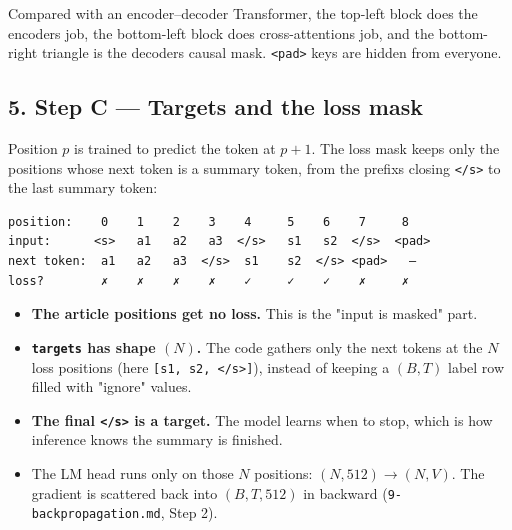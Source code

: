 \documentclass[11pt,a4paper,oneside]{report}
\providecommand{\tightlist}{\setlength{\itemsep}{0pt}\setlength{\parskip}{0pt}}
\begin{document}
Compared with an encoder--decoder Transformer, the top-left block does the encoder\textquotesingle s job, the bottom-left block does cross-attention\textquotesingle s job, and the bottom-right triangle is the decoder\textquotesingle s causal mask. \texttt{\textless{}pad\textgreater{}} keys are hidden from everyone.

\subsection{5. Step C --- Targets and the loss mask}\label{5-step-c--targets-and-the-loss-mask}

Position \(p\) is trained to predict the token at \(p + 1\). The loss mask keeps only the positions whose next token is a summary token, from the prefix\textquotesingle s closing \texttt{\textless{}/\allowbreak{}s\textgreater{}} to the last summary token:

\begin{center}\end{center}

\begin{Verbatim}[fontsize=\small]
position:    0    1    2    3    4     5    6    7     8
input:      <s>   a1   a2   a3  </s>   s1   s2  </s>  <pad>
next token:  a1   a2   a3  </s>  s1    s2  </s> <pad>   –
loss?        ✗    ✗    ✗    ✗    ✓     ✓    ✓    ✗     ✗
\end{Verbatim}

\begin{itemize}
\tightlist
\item
  \textbf{The article positions get no loss.} This is the "input is masked" part.
\item
  \textbf{\texttt{targets} has shape \((N)\).} The code gathers only the next tokens at the \(N\) loss positions (here \texttt{{[}s1,\ s2,\ \textless{}/s\textgreater{}{]}}), instead of keeping a \((B, T)\) label row filled with "ignore" values.
\item
  \textbf{The final \texttt{\textless{}/\allowbreak{}s\textgreater{}} is a target.} The model learns when to stop, which is how inference knows the summary is finished.
\item
  The LM head runs only on those \(N\) positions: \((N, 512) \rightarrow (N, V)\). The gradient is scattered back into \((B, T, 512)\) in backward (\texttt{9-backpropagation.\allowbreak{}md}, Step 2).
\end{itemize}
\end{document}
